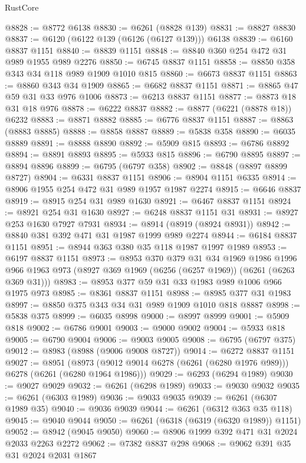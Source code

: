 \begin{lexlean}{RustCore}
\begin{coremodule}
@8828 := @8772 @6138
@8830 := @6261 (@8828 @139)
@8831 := @8827 @8830
@8837 := @6120 (@6122 @139 (@6126 (@6127 @139))) @6138
@8839 := @6160 @8837 @1151
@8840 := @8839 @1151
@8848 := @8840 @360 @254 @472 @31 @989 @1955 @989 @2276
@8850 := @6745 @8837 @1151
@8858 := @8850 @358 @343 @34 @118 @989 @1909 @1010 @815
@8860 := @6673 @8837 @1151
@8863 := @8860 @343 @34 @1909
@8865 := @6682 @8837 @1151
@8871 := @8865 @47 @59 @31 @33 @976 @1006
@8873 := @6213 @8837 @1151
@8877 := @8873 @18 @31 @18 @976
@8878 := @6222 @8837
@8882 := @8877 (@6221 (@8878 @18)) @6232
@8883 := @8871 @8882
@8885 := @6776 @8837 @1151
@8887 := @8863 (@8883 @8885)
@8888 := @8858 @8887
@8889 := @5838 @358
@8890 := @6035 @8889
@8891 := @8888 @8890
@8892 := @5909 @815
@8893 := @6786 @8892
@8894 := @8891 @8893
@8895 := @5933 @815
@8896 := @6790 @8895
@8897 := @8894 @8896
@8899 := @6795 (@6797 @358)
@8902 := @8848 (@8897 @8899 @8727)
@8904 := @6331 @8837 @1151
@8906 := @8904 @1151 @6335
@8914 := @8906 @1955 @254 @472 @31 @989 @1957 @1987 @2274
@8915 := @6646 @8837
@8919 := @8915 @254 @31 @989 @1630
@8921 := @6467 @8837 @1151
@8924 := @8921 @254 @31 @1630
@8927 := @6248 @8837 @1151 @31
@8931 := @8927 @253 @1630 @7927 @7931
@8934 := @8914 (@8919 (@8924 @8931))
@8942 := @8840 @381 @392 @471 @31 @1987 @1999 @989 @2274
@8944 := @6184 @8837 @1151
@8951 := @8944 @363 @380 @35 @118 @1987 @1997 @1989
@8953 := @6197 @8837 @1151
@8973 := @8953
    @370
    @379
    @31
    @34
    @1969
    @1986
    @1996
    @966
    @1963
    @973
    (@8927 @369 @1969 (@6256 (@6257 @1969)) (@6261 (@6263 @369 @31)))
@8983 := @8953 @377 @59 @31 @33 @1983 @989 @1006 @966 @1975 @973
@8985 := @8361 @8837 @1151
@8988 := @8985 @377 @31 @1983
@8997 := @8850 @375 @343 @34 @31 @989 @1909 @1010 @818 @8887
@8998 := @5838 @375
@8999 := @6035 @8998
@9000 := @8997 @8999
@9001 := @5909 @818
@9002 := @6786 @9001
@9003 := @9000 @9002
@9004 := @5933 @818
@9005 := @6790 @9004
@9006 := @9003 @9005
@9008 := @6795 (@6797 @375)
@9012 := @8983 (@8988 (@9006 @9008 @8727))
@9014 := @6272 @8837 @1151
@9027 := @8951
    (@8973 (@9012 @9014 @6278 (@6261 (@6280 @1976 @989))) @6278 (@6261 (@6280 @1964 @1986)))
@9029 := @6293 (@6294 @1989)
@9030 := @9027 @9029
@9032 := @6261 (@6298 @1989)
@9033 := @9030 @9032
@9035 := @6261 (@6303 @1989)
@9036 := @9033 @9035
@9039 := @6261 (@6307 @1989 @35)
@9040 := @9036 @9039
@9044 := @6261 (@6312 @363 @35 @118)
@9045 := @9040 @9044
@9050 := @6261 (@6318 (@6319 (@6320 @1989)) @1151)
@9052 := @8942 (@9045 @9050)
@9060 := @8906 @1999 @392 @471 @31 @2024 @2033 @2263 @2272
@9062 := @7382 @8837 @298
@9068 := @9062 @391 @35 @31 @2024 @2031 @1867

\end{coremodule}
\end{lexlean}
